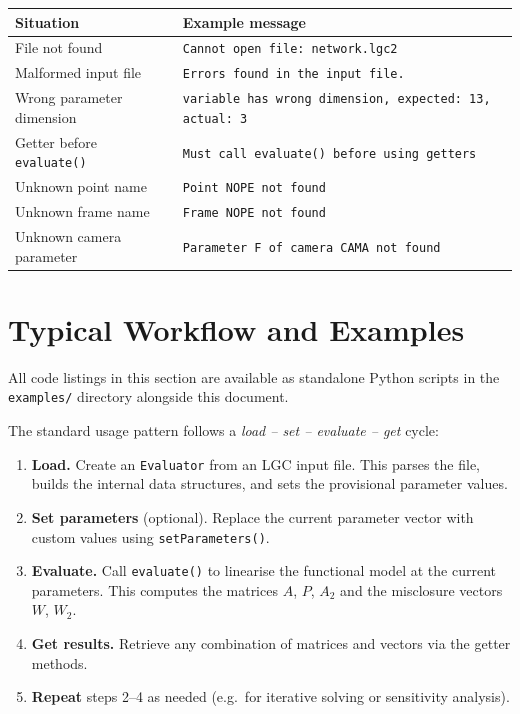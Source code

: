 \documentclass[a4paper,11pt]{article}
\newcommand{\code}[1]{\texttt{#1}}
\begin{document}
\begin{center}
\small
\begin{tabular}{ll}
    \toprule
    Situation & Example message \\
    \midrule
    File not found &
        \code{Cannot open file: network.lgc2} \\
    Malformed input file &
        \code{Errors found in the input file.} \\
    Wrong parameter dimension &
        \code{variable has wrong dimension, expected: 13, actual: 3} \\
    Getter before \code{evaluate()} &
        \code{Must call evaluate() before using getters} \\
    Unknown point name &
        \code{Point NOPE not found} \\
    Unknown frame name &
        \code{Frame NOPE not found} \\
    Unknown camera parameter &
        \code{Parameter F of camera CAMA not found} \\
    \bottomrule
\end{tabular}
\end{center}

\section{Typical Workflow and Examples}
\label{sec:workflow}

All code listings in this section are available as standalone Python
scripts in the \code{examples/} directory alongside this document.

The standard usage pattern follows a \emph{load -- set -- evaluate -- get}
cycle:

\begin{enumerate}[leftmargin=2em]
    \item \textbf{Load.} Create an \code{Evaluator} from an LGC input
        file. This parses the file, builds the internal data structures,
        and sets the provisional parameter values.
    \item \textbf{Set parameters} (optional). Replace the current
        parameter vector with custom values using
        \code{setParameters()}.
    \item \textbf{Evaluate.} Call \code{evaluate()} to linearise the
        functional model at the current parameters. This computes the
        matrices $A$, $P$, $A_2$ and the
        misclosure vectors $W$, $W_2$.
    \item \textbf{Get results.} Retrieve any combination of matrices
        and vectors via the getter methods.
    \item \textbf{Repeat} steps 2--4 as needed (e.g.\ for iterative
        solving or sensitivity analysis).
\end{enumerate}
\end{document}
